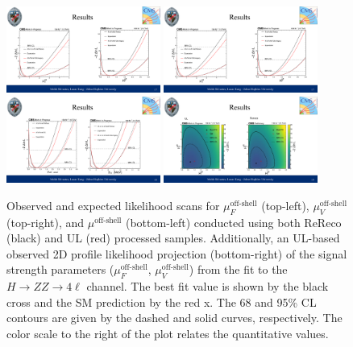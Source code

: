 \begin{figure}[!hbt]
\centering
\includegraphics[width=0.45\textwidth]{figures/scan_muFoff_upd.pdf}
\includegraphics[width=0.45\textwidth]{figures/scan_muFoff_upd.pdf}\\ 
\includegraphics[width=0.45\textwidth]{figures/scan_Roff_upd.pdf}
\includegraphics[width=0.45\textwidth]{figures/scan_mu2D_UL.pdf}\\ 
\caption{
Observed and expected likelihood scans for $\mu_F^{\text{off-shell}}$ (top-left), $\mu_V^{\text{off-shell}}$ (top-right), and $\mu^{\text{off-shell}}$ (bottom-left) conducted using both ReReco (black) and UL (red) processed samples. Additionally, an UL-based observed 2D profile likelihood projection (bottom-right) of the \offshell signal strength parameters ($\mu^\text{off-shell}_{F}$, $\mu^\text{off-shell}_{V}$) from the fit to the \offshell $H\to ZZ\to4\ell$ channel. The best fit value is shown by the black cross and the SM prediction by the red x. The 68 and 95\% CL contours are given by the dashed and solid curves, respectively. The color scale to the right of the plot relates the quantitative values.
}
\label{fig:muscansUL}
\end{figure}

